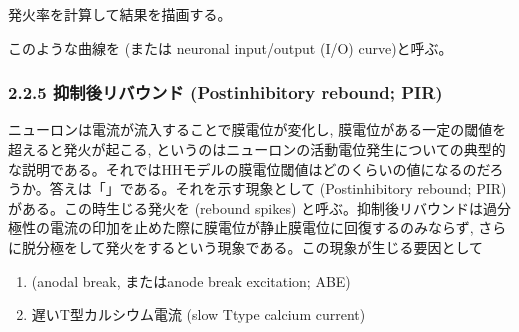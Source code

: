 \documentclass[letterpaper,10pt,english]{sphinxmanual}
\begin{document}
発火率を計算して結果を描画する。

\begin{sphinxVerbatim}[commandchars=\\\{\}]
  \PYG{p}{[} \PYG{p}{]}    \PYG{p}{[} \PYG{p}{]}  
   
  

\PYG{p}{[}\PYG{p}{]} \PYG{p}{[} \PYG{p}{]}
      
\end{sphinxVerbatim}

このような曲線を (または neuronal input/output (I/O) curve)と呼ぶ。


\subsubsection{2.2.5  抑制後リバウンド (Postinhibitory rebound; PIR)}
\label{\detokenize{2-2_hodgkinhuxley:postinhibitory-rebound-pir}}
ニューロンは電流が流入することで膜電位が変化し, 膜電位がある一定の閾値を超えると発火が起こる, というのはニューロンの活動電位発生についての典型的な説明である。それではHHモデルの膜電位閾値はどのくらいの値になるのだろうか。答えは「」である。それを示す現象として  (Postinhibitory rebound; PIR)がある。この時生じる発火を (rebound spikes)
と呼ぶ。抑制後リバウンドは過分極性の電流の印加を止めた際に膜電位が静止膜電位に回復するのみならず, さらに脱分極をして発火をするという現象である。この現象が生じる要因として
\begin{enumerate}
%
\item {} 
 (anodal break, またはanode break excitation; ABE)

\item {} 
遅いT型カルシウム電流 (slow T\sphinxhyphen{}type calcium current)

\end{enumerate}
\end{document}
